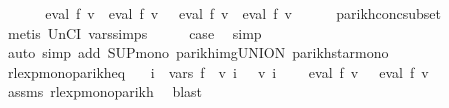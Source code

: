 \begin{isabellebody}
\ \ \isamarkupfalse%
\ \isamarkupfalse%
\ {\isachardoublequoteopen}{\isasymPsi}\ {\isacharparenleft}{\kern0pt}eval\ f{}\ v\ {\isacharat}{\kern0pt}{\isacharat}{\kern0pt}\ eval\ f{}\ v{\isacharparenright}{\kern0pt}\ {\isasymsubseteq}\ {\isasymPsi}\ {\isacharparenleft}{\kern0pt}eval\ f{}\ v{\isacharprime}{\kern0pt}\ {\isacharat}{\kern0pt}{\isacharat}{\kern0pt}\ eval\ f{}\ v{\isacharprime}{\kern0pt}{\isacharparenright}{\kern0pt}{\isachardoublequoteclose}\isanewline
\ \ \ \ \isamarkupfalse%
\ parikh{\isacharunderscore}{\kern0pt}conc{\isacharunderscore}{\kern0pt}subset\ \isamarkupfalse%
\ {\isacharparenleft}{\kern0pt}metis\ UnCI\ vars{\isachardot}{\kern0pt}simps{\isacharparenleft}{\kern0pt}{}{\isacharparenright}{\kern0pt}{\isacharparenright}{\kern0pt}\isanewline
\ \ \isamarkupfalse%
\ \isamarkupfalse%
\ {\isacharquery}{\kern0pt}case\ \isamarkupfalse%
\ simp\isanewline
{}\isamarkupfalse%
\ {\isacharparenleft}{\kern0pt}auto\ simp\ add{\isacharcolon}{\kern0pt}\ SUP{\isacharunderscore}{\kern0pt}mono{\isacharprime}{\kern0pt}\ parikh{\isacharunderscore}{\kern0pt}img{\isacharunderscore}{\kern0pt}UNION\ parikh{\isacharunderscore}{\kern0pt}star{\isacharunderscore}{\kern0pt}mono{\isacharparenright}{\kern0pt}%
\endisatagproof
{\isafoldproof}%
%
\isadelimproof
\isanewline
%
\endisadelimproof
\isanewline
{}\isamarkupfalse%
\ rlexp{\isacharunderscore}{\kern0pt}mono{\isacharunderscore}{\kern0pt}parikh{\isacharunderscore}{\kern0pt}eq{\isacharcolon}{\kern0pt}\isanewline
\ \ \ {\isachardoublequoteopen}{\isasymforall}i\ {\isasymin}\ vars\ f{\isachardot}{\kern0pt}\ {\isasymPsi}\ {\isacharparenleft}{\kern0pt}v\ i{\isacharparenright}{\kern0pt}\ {\isacharequal}{\kern0pt}\ {\isasymPsi}\ {\isacharparenleft}{\kern0pt}v{\isacharprime}{\kern0pt}\ i{\isacharparenright}{\kern0pt}{\isachardoublequoteclose}\isanewline
\ \ \ {\isachardoublequoteopen}{\isasymPsi}\ {\isacharparenleft}{\kern0pt}eval\ f\ v{\isacharparenright}{\kern0pt}\ {\isacharequal}{\kern0pt}\ {\isasymPsi}\ {\isacharparenleft}{\kern0pt}eval\ f\ v{\isacharprime}{\kern0pt}{\isacharparenright}{\kern0pt}{\isachardoublequoteclose}\isanewline
%
\isadelimproof
\ \ %
\endisadelimproof
%
\isatagproof
{}\isamarkupfalse%
\ assms\ rlexp{\isacharunderscore}{\kern0pt}mono{\isacharunderscore}{\kern0pt}parikh\ \isamarkupfalse%
\ blast%

\end{isabellebody}
